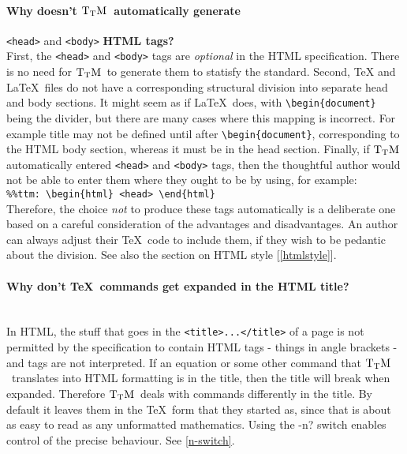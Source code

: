 \documentclass[12pt]{article}
\def\TtM{$\rm{}T_TH$}
\def\TtM{$\rm{}T_TM$}%
\begin{document}
\paragraph{Why doesn't \TtM\ automatically generate} \verb!<head>!
and \verb!<body>! \textbf{HTML tags?}\leavevmode\\
 First, the \verb!<head>! and
\verb!<body>! tags are \emph{optional} in the HTML specification. There is
no need for \TtM\ to generate them to statisfy the standard. Second, \TeX
and \LaTeX\ files do not have a corresponding structural division into
separate head and body sections. It might seem as if \LaTeX\ does, with
\verb!\begin{document}!  being the divider, but there are many cases
where this mapping is incorrect. For example title may not be defined
until after \verb!\begin{document}!, corresponding to the HTML body
section, whereas it must be in the head section. Finally, if \TtM
automatically entered \verb!<head>! and \verb!<body>! tags, then the
thoughtful author would not be able to enter them where they ought to
be by using, for example:\leavevmode\\
\verb!%%ttm: \begin{html} <head> \end{html}!\leavevmode\\
Therefore, the choice \emph{not} to produce these tags automatically
is a deliberate one based on a careful consideration of the advantages
and disadvantages. An author can always adjust their \TeX\ code to
include them, if they wish to be pedantic about the division. See also
the section on HTML style [\ref{htmlstyle}].

\paragraph{Why don't \TeX\ commands get expanded in the HTML title?}\leavevmode\\
In HTML, the stuff that goes in the \verb|<title>...</title>| of a
page is not permitted by the specification to contain HTML tags -
things in angle brackets - and tags are not interpreted. If an
equation or some other command that \TtM\ translates into HTML
formatting is in the title, then the title will break when
expanded. Therefore \TtM\ deals with commands differently in the
title.  By default it leaves them in the \TeX\ form that they started
as, since that is about as easy to read as any unformatted
mathematics. Using the -n? switch enables control of the precise
behaviour. See \ref{n-switch}.
\end{document}
